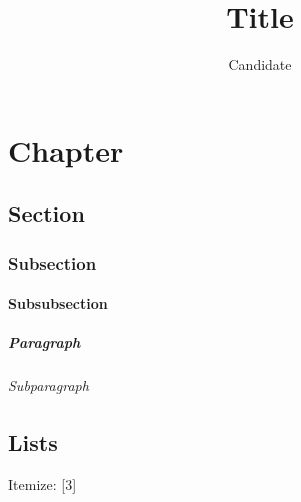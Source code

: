 \documentclass[phd,UKenglish,counters by chapter]{uniud}
\title{Title}
\author{Candidate}
\begin{document}

\frontmatter

\maketitle

\tableofcontents*


\mainmatter

\chapter{Chapter}
\blindmathtrue

\blindtext

\section{Section}

\blindtext

\subsection{Subsection}

\blindtext

\subsubsection{Subsubsection}

\blindtext

\paragraph{Paragraph}

\blindtext

\subparagraph{Subparagraph}

\blindtext

\section{Lists}

\blindtext[1]
Itemize:
[3]
\end{document}

